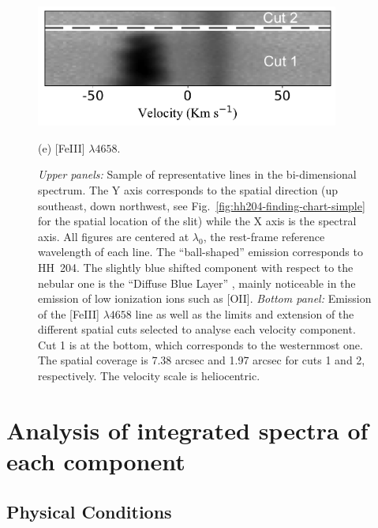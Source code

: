 \documentclass[twocolumn]{aastex63}
\newcommand{\eduardo}[1]{{\color{teal}E: #1}}
\newcommand{\cesar}[1]{{\color{red}C: #1}}
\begin{document}
\begin{figure}
  \begin{minipage}{10cm}
    \centering\includegraphics[height=4cm, width=\columnwidth]{2D_4658_cuts.pdf}
    \centerline{(e) [Fe\thinspace III] $\lambda 4658$.} 
    \smallskip
  \end{minipage}
  \caption{\textit{Upper panels:} Sample of representative lines in the bi-dimensional spectrum. The Y axis corresponds to the spatial direction (up southeast, down northwest, see Fig.~\ref{fig:hh204-finding-chart-simple} for the spatial location of the slit) while the X axis is the spectral axis. All figures are centered at $\lambda_0$, the rest-frame reference wavelength of each line. The ``ball-shaped'' emission corresponds to HH~204. The slightly blue shifted component with respect to the nebular one is the ``Diffuse Blue Layer'' \citep{Deharveng73,garciadiaz07}, mainly noticeable in the emission of low ionization ions such as [O\thinspace II]. \textit{Bottom panel:} Emission of the [Fe\thinspace III] $\lambda 4658$ line as well as the limits and extension of the different spatial cuts selected to analyse each velocity component. Cut 1 is at the bottom, which corresponds to the westernmost one. The spatial coverage is 7.38 arcsec and 1.97 arcsec for cuts 1 and 2, respectively. The velocity scale is heliocentric.}
  \label{fig:cuts}
\end{figure}


\section{Analysis of integrated spectra of each component}
\label{sec:gen_analysis}


\subsection{Physical Conditions}
\label{subsec:physical_cond}
\end{document}
